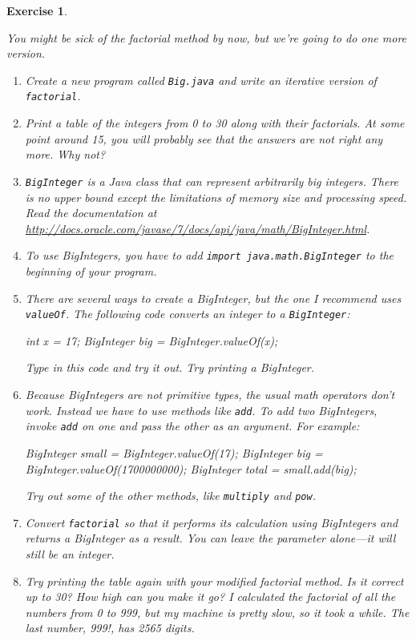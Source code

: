\documentclass[12pt]{book}
\theoremstyle{exercise}
\newtheorem{exercise}{Exercise}[chapter]
\newcommand{\java}[1]{\lstinline{#1}} %
\begin{document}
\begin{exercise}
\label{ex.biginteger}

You might be sick of the factorial method by now, but we're going to do one more version.

\begin{enumerate}

\item Create a new program called \java{Big.java} and write an iterative version of \java{factorial}.

\item Print a table of the integers from 0 to 30 along with their factorials.
At some point around 15, you will probably see that the answers are not right any more.
Why not?

\item \java{BigInteger} is a Java class that can represent arbitrarily big integers.
There is no upper bound except the limitations of memory size and processing speed.
Read the documentation at \url{http://docs.oracle.com/javase/7/docs/api/java/math/BigInteger.html}.

\item To use BigIntegers, you have to add \java{import java.math.BigInteger} to the beginning of your program.

\item There are several ways to create a BigInteger, but the one I recommend uses \java{valueOf}.
The following code converts an integer to a \java{BigInteger}:

\begin{code}
    int x = 17;
    BigInteger big = BigInteger.valueOf(x);
\end{code}

Type in this code and try it out.
Try printing a BigInteger.

\item Because BigIntegers are not primitive types, the usual math operators don't work.
Instead we have to use methods like \java{add}.
To add two BigIntegers, invoke \java{add} on one and pass the other as an argument.
For example:

\begin{code}
    BigInteger small = BigInteger.valueOf(17);
    BigInteger big = BigInteger.valueOf(1700000000);
    BigInteger total = small.add(big);
\end{code}

Try out some of the other methods, like \java{multiply} and \java{pow}.

\item Convert \java{factorial} so that it performs its calculation using BigIntegers and returns a BigInteger as a result.
You can leave the parameter alone---it will still be an integer.

\item Try printing the table again with your modified factorial method.
Is it correct up to 30?
How high can you make it go?
I calculated the factorial of all the numbers from 0 to 999, but my machine is pretty slow, so it took a while.
The last number, 999!, has 2565 digits.

\end{enumerate}
\end{exercise}
\end{document}
